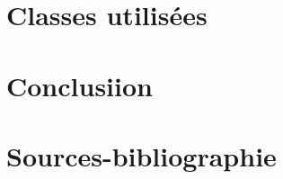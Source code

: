 \documentclass[12pt]{article}
\begin{document}
\section{Classes utilisées}

\section{Conclusiion}


\section{Sources-bibliographie}
\cite{dibbelt2017connection} 
\cite{butts2020raptor}
\cite{epfl2024cs108}
\cite{transnetlabCSA}
\cite{gtfsReference}
\cite{futura2009distance}
\cite{geeko2018distance}
\cite{geeksforgeeks_haversine}
\cite{wikipedia_geohash}
\cite{mattaparthi2024ballkd}
\cite{fieldsend_onlineballtree}
\cite{woltmann2025astar}
\cite{wikipedia_astar}
\cite{geeksforgeeks_astar}
\cite{wikipedia_dijkstra}
\cite{baeldung_collections_sort}
\cite{wikipedia_timsort}

\printbibliography
\end{document}
